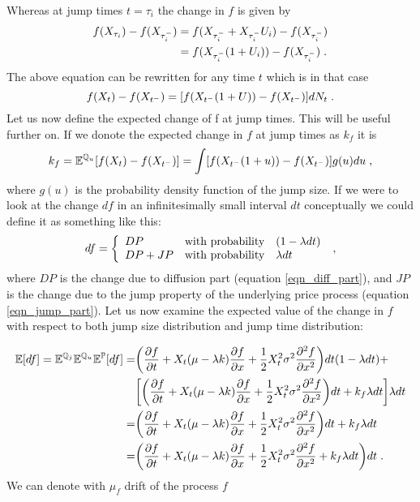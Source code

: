\documentclass[times, utf8, diplomski]{fer}
\begin{document}
\noindent Whereas at jump times $t = \tau_i$ the change in $f$ is given by 
\begin{equation}
\begin{split}
	f(X_{\tau_i}) - f(X_{\tau_i^-}) &= f(X_{\tau_i^-} + X_{\tau_i^-}U_i) - f(X_{\tau_i^-}) \\
	   &= f(X_{\tau_i^-}(1+U_i)) - f(X_{\tau_i^-}) \hspace{0.1cm}.
\end{split}
\end{equation}
The above equation can be rewritten for any time $t$ which is in that case
\begin{equation} \label{eqn_jump_part}
	f(X_t) - f(X_{t^-}) = [f(X_{t^-}(1 + U)) - f(X_{t^-})]dN_t \hspace{0.1cm}.
\end{equation}
Let us now define the expected change of f at jump times. This will be useful further on. If we donote the expected change in $f$ at jump times as $k_f$ it is
\begin{equation}
	k_f = \mathbb{E}^{\mathbb{Q}_u}[f(X_t) - f(X_{t^-})] = \int[f(X_{t^-}(1 + u)) - f(X_{t^-})]g(u)du \hspace{0.1cm},
\end{equation} where $g(u)$ is the probability density function of the jump size.
If we were to look at the change $df$ in an infinitesimally small interval $dt$ conceptually we could define it as something like this:
$$
	df = \left\{  \begin{array}{lcl} DP & \mbox{with probability} & (1 - \lambda dt) \\
			  DP + JP & \mbox{with probability} & \lambda dt \end{array} \right.  \hspace{0.1cm},
$$ where $DP$ is the change due to diffusion part (equation \ref{eqn_diff_part}), and $JP$ is the change due to the jump property of the underlying price process (equation \ref{eqn_jump_part}). Let us now examine the expected value of the change in $f$ with respect to both jump size distribution and jump time distribution:

\begin{align*}
\mathbb{E}[df] = \mathbb{E}^{\mathbb{Q}_j}\mathbb{E}^{\mathbb{Q}_u}\mathbb{E}^{\mathbb{P}}[df] =& \bigg(\frac{\partial f}{\partial t} + X_t(\mu - \lambda k)\frac{\partial f}{\partial x} + \frac{1}{2}X_t^2\sigma^2\frac{\partial^2 f}{\partial x^2}\bigg)dt(1-\lambda dt) + \\
& \bigg[\bigg(\frac{\partial f}{\partial t} + X_t(\mu - \lambda k)\frac{\partial f}{\partial x} + \frac{1}{2}X_t^2\sigma^2\frac{\partial^2 f}{\partial x^2}\bigg)dt + k_f \lambda dt \bigg]\lambda dt \\
=& \bigg(\frac{\partial f}{\partial t} + X_t(\mu - \lambda k)\frac{\partial f}{\partial x} + \frac{1}{2}X_t^2\sigma^2\frac{\partial^2 f}{\partial x^2}\bigg)dt + k_f \lambda dt \\
=& \bigg(\frac{\partial f}{\partial t} + X_t(\mu - \lambda k)\frac{\partial f}{\partial x} + \frac{1}{2}X_t^2\sigma^2\frac{\partial^2 f}{\partial x^2} + k_f \lambda dt\bigg)dt \hspace{0.1cm}.
\end{align*}
We can denote with $\mu_f$ drift of the process $f$
\end{document}
